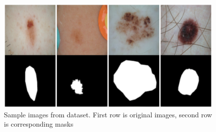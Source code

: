 \begin{figure}
    \centerline{\includegraphics[width=1\columnwidth]{04-methodology/figures/sample-images-from-dataset.png}}
    \caption{Sample images from dataset. First row is original images, second row is corresponding masks}
    \label{fig:sample-images-from-dataset}
\end{figure}
